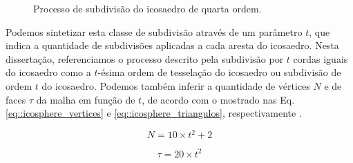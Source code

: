 \documentclass[
    12pt,                %
    oneside,            %
    a4paper,            %
    english,            %
    french,                %
    spanish,            %
    brazil                %
    ]{abntex2}
\begin{document}
\begin{figure}[ht]
\centering
\captionsetup[subfloat]{farskip=0pt,nearskip=0pt}
\centering
    \hspace{1em}
     \caption{Processo de subdivisão do icosaedro de quarta ordem.}
    \label{fig::icosaedro_subdivisao_4}
\end{figure}

Podemos sintetizar esta classe de subdivisão através de um parâmetro $t$, que indica a quantidade de subdivisões aplicadas a cada aresta do icosaedro. Nesta dissertação, referenciamos o processo descrito pela subdivisão por $t$ cordas iguais do icosaedro como a \textsf{$t$-ésima ordem de tesselação do icosaedro} ou \textsf{subdivisão de ordem $t$ do icosaedro}. Podemos também inferir a quantidade de vértices $N$ e de faces $\tau$ da malha em função de $t$, de acordo com o mostrado nas Eq. \ref{eq::icosphere_vertices} e \ref{eq::icosphere_triangulos}, respectivamente \cite{popko2012}.

\begin{equation}
\label{eq::icosphere_vertices}
    N = 10\times t^2 + 2
\end{equation}

\begin{equation}
\label{eq::icosphere_triangulos}
\tau = 20\times t^2
\end{equation}
\end{document}
